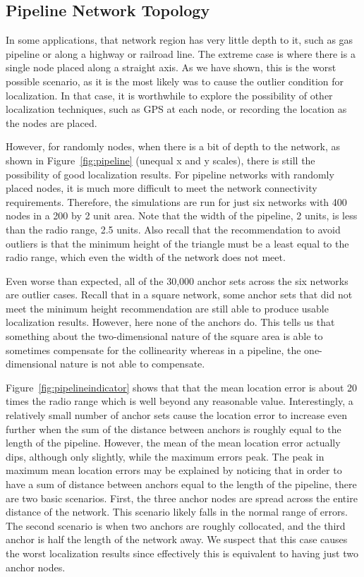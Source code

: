 \subsection{Pipeline Network Topology}

In some applications, that network region has very little depth to it, such as gas pipeline or along a highway or railroad line.  The extreme case is where there is a single node placed along a straight axis.  As we have shown, this is the worst possible scenario, as it is the most likely was to cause the outlier condition for localization.  In that case, it is worthwhile to explore the possibility of other localization techniques, such as GPS at each node, or recording the location as the nodes are placed.  

However, for randomly nodes, when there is a bit of depth to the network, as shown in Figure~\ref{fig:pipeline} (unequal x and y scales), there is still the possibility of good localization results.  For pipeline networks with randomly placed nodes, it is much more difficult to meet the network connectivity requirements.  Therefore, the simulations are run for just six networks with 400 nodes in a 200 by 2 unit area.  Note that the width of the pipeline, 2 units, is less than the radio range, 2.5 units.  Also recall that the recommendation to avoid outliers is that the minimum height of the triangle must be a least equal to the radio range, which even the width of the network does not meet. 

Even worse than expected, all of the 30,000 anchor sets across the six networks are outlier cases.  Recall that in a square network, some anchor sets that did not meet the minimum height recommendation are still able to produce usable localization results.  However, here none of the anchors do.  This tells us that something about the two-dimensional nature of the square area is able to sometimes compensate for the collinearity whereas in a pipeline, the one-dimensional nature is not able to compensate.

Figure~\ref{fig:pipelineindicator} shows that that the mean location error is about 20 times the radio range which is well beyond any reasonable value. Interestingly, a relatively small number of anchor sets cause the location error to increase even further when the sum of the distance between anchors is roughly equal to the length of the pipeline.  However, the mean of the mean location error actually dips, although only slightly, while the maximum errors peak.  The peak in maximum mean location errors may be explained by noticing that in order to have a sum of distance between anchors equal to the length of the pipeline, there are two basic scenarios.  First, the three anchor nodes are spread across the entire distance of the network.  This scenario likely falls in the normal range of errors.  The second scenario is when two anchors are roughly collocated, and the third anchor is half the length of the network away.  We suspect that this case causes the worst localization results since effectively this is equivalent to having just two anchor nodes.

